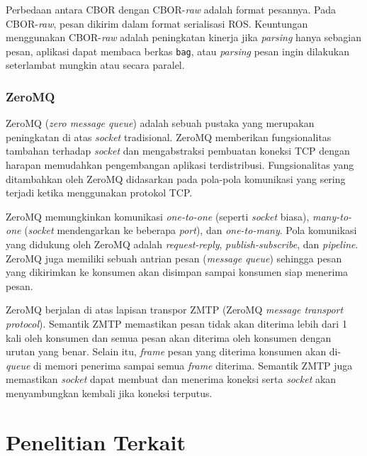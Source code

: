 Perbedaan antara CBOR dengan CBOR-\textit{raw} adalah format pesannya. Pada
CBOR-\textit{raw}, pesan dikirim dalam format serialisasi ROS. Keuntungan
menggunakan C\-B\-O\-R-\textit{raw} adalah peningkatan kinerja jika \textit{parsing}
hanya sebagian pesan, aplikasi dapat membaca berkas \texttt{bag}, atau
\textit{parsing} pesan ingin dilakukan seterlambat mungkin atau secara paralel.

\subsubsection{ZeroMQ}

ZeroMQ (\textit{zero message queue}) adalah sebuah pustaka yang merupakan
pe\-ning\-ka\-tan di atas \textit{socket} tradisional. ZeroMQ memberikan
fungsionalitas tambahan terhadap \textit{socket} dan mengabstraksi pembuatan
koneksi TCP dengan harapan memudahkan pengembangan aplikasi terdistribusi.
Fungsionalitas yang ditambahkan oleh ZeroMQ didasarkan pada pola-pola komunikasi
yang sering terjadi ketika menggunakan protokol TCP.

ZeroMQ memungkinkan komunikasi \textit{one-to-one} (seperti \textit{socket}
biasa), \textit{many-to-one} (\textit{socket} mendengarkan ke beberapa
\textit{port}), dan \textit{one-to-many}. Pola komunikasi yang didukung oleh
ZeroMQ adalah \textit{request-reply}, \textit{publish-subscribe}, dan
\textit{pipeline}. ZeroMQ juga memiliki sebuah antrian pesan (\textit{message
    queue}) sehingga pesan yang dikirimkan ke konsumen akan disimpan
sampai konsumen siap menerima pesan.

ZeroMQ berjalan di atas lapisan transpor ZMTP (ZeroMQ \textit{message transport
    protocol}). Semantik ZMTP memastikan pesan tidak akan diterima lebih dari 1 kali
oleh konsumen dan semua pesan akan diterima oleh konsumen dengan urutan yang
benar. Selain itu, \textit{frame} pesan yang diterima konsumen akan
di-\textit{queue} di memori penerima sampai semua \textit{frame} diterima.
Semantik ZMTP juga memastikan \textit{socket} dapat membuat dan menerima koneksi
serta \textit{socket} akan menyambungkan kembali jika koneksi terputus.

\section{Penelitian Terkait}
\blindtext